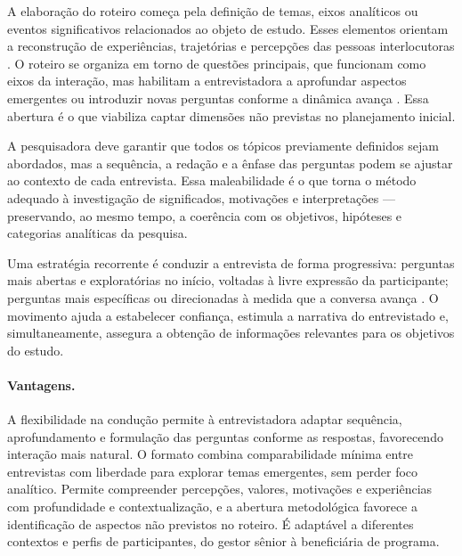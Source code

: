 \documentclass[12pt, a4paper, openany]{book}
\begin{document}
A elabora\c{c}\~ao do roteiro come\c{c}a pela defini\c{c}\~ao de temas, eixos anal\'iticos ou eventos significativos relacionados ao objeto de estudo. Esses elementos orientam a reconstru\c{c}\~ao de experi\^encias, trajet\'orias e percep\c{c}\~oes das pessoas interlocutoras \citep{alonso2016metodos}. O roteiro se organiza em torno de quest\~oes principais, que funcionam como eixos da intera\c{c}\~ao, mas habilitam a entrevistadora a aprofundar aspectos emergentes ou introduzir novas perguntas conforme a din\^amica avan\c{c}a \citep{lima2016entrevistas}. Essa abertura \'e o que viabiliza captar dimens\~oes n\~ao previstas no planejamento inicial.

A pesquisadora deve garantir que todos os t\'opicos previamente definidos sejam abordados, mas a sequ\^encia, a reda\c{c}\~ao e a \^enfase das perguntas podem se ajustar ao contexto de cada entrevista. Essa maleabilidade \'e o que torna o m\'etodo adequado \`a investiga\c{c}\~ao de significados, motiva\c{c}\~oes e interpreta\c{c}\~oes --- preservando, ao mesmo tempo, a coer\^encia com os objetivos, hip\'oteses e categorias anal\'iticas da pesquisa.

Uma estrat\'egia recorrente \'e conduzir a entrevista de forma progressiva: perguntas mais abertas e explorat\'orias no in\'icio, voltadas \`a livre express\~ao da participante; perguntas mais espec\'ificas ou direcionadas \`a medida que a conversa avan\c{c}a \citep{silva2006entrevista}. O movimento ajuda a estabelecer confian\c{c}a, estimula a narrativa do entrevistado e, simultaneamente, assegura a obten\c{c}\~ao de informa\c{c}\~oes relevantes para os objetivos do estudo.

\paragraph{Vantagens.} A flexibilidade na condu\c{c}\~ao permite \`a entrevistadora adaptar sequ\^encia, aprofundamento e formula\c{c}\~ao das perguntas conforme as respostas, favorecendo intera\c{c}\~ao mais natural. O formato combina comparabilidade m\'inima entre entrevistas com liberdade para explorar temas emergentes, sem perder foco anal\'itico. Permite compreender percep\c{c}\~oes, valores, motiva\c{c}\~oes e experi\^encias com profundidade e contextualiza\c{c}\~ao, e a abertura metodol\'ogica favorece a identifica\c{c}\~ao de aspectos n\~ao previstos no roteiro. \'E adapt\'avel a diferentes contextos e perfis de participantes, do gestor s\^enior \`a benefici\'aria de programa.
\end{document}

